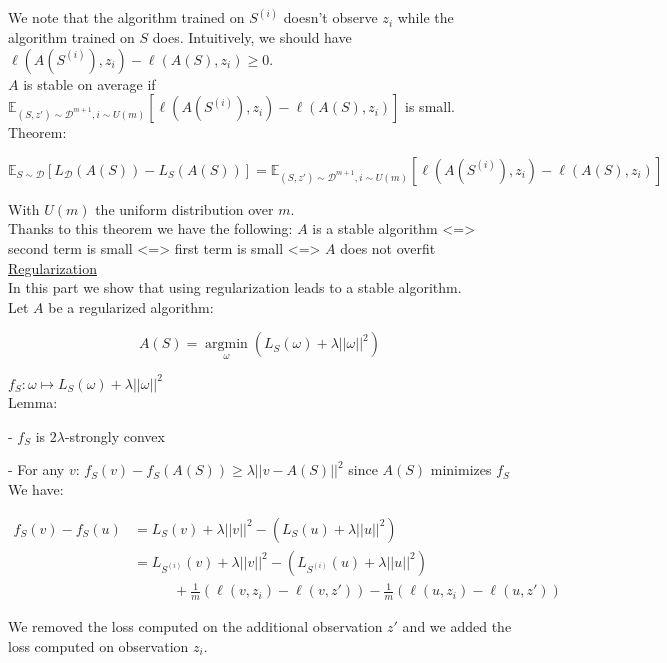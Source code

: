We note that the algorithm trained on $S^{(i)}$ doesn't observe $z_i$ while the algorithm trained on $S$ does. Intuitively, we should have $\ell(A(S^{(i)}),z_i) - \ell(A(S),z_i) \geq 0$. \\

$A$ is stable on average if $\mathbb{E}_{(S,z') \sim \mathcal{D}^{m+1}, i \sim U(m)}[\ell(A(S^{(i)}),z_i) - \ell(A(S),z_i)]$ is small. \\

Theorem: 

$$\mathbb{E}_{S \sim \mathcal{D}}[L_{\mathcal{D}}(A(S)) - L_S(A(S))] = \mathbb{E}_{(S,z') \sim \mathcal{D}^{m+1}, i \sim U(m)}[\ell(A(S^{(i)}),z_i) - \ell(A(S),z_i)]$$

With $U(m)$ the uniform distribution over $m$. \\

Thanks to this theorem we have the following: $A$ is a stable algorithm <=> second term is small <=> first term is small <=> $A$ does not overfit \\

\underline{Regularization} \\

In this part we show that using regularization leads to a stable algorithm. \\

Let $A$ be a regularized algorithm:

$$A(S) = \underset{\omega}{\operatorname{argmin}} (L_S(\omega) + \lambda || \omega ||^2)$$

$f_S : \omega \mapsto L_S(\omega) + \lambda || \omega ||^2$ \\

Lemma: 

- $f_S$ is $2\lambda$-strongly convex

- For any $v$: $f_S(v) - f_S(A(S)) \geq \lambda || v - A(S) ||^2$  since $A(S)$ minimizes $f_S$ \\

We have:

\begin{align*}
  f_S(v) - f_S(u) &= L_S(v) + \lambda || v ||^2 - (L_S(u) + \lambda || u ||^2) \\
            &= L_{S^{(i)}}(v) + \lambda || v ||^2 - (L_{S^{(i)}}(u) + \lambda || u ||^2) \\
	   &~~~~~~~~~~~~~+ \frac{1}{m}(\ell(v, z_i) - \ell(v, z')) - \frac{1}{m}(\ell(u, z_i) - \ell(u, z'))
\end{align*}

We removed the loss computed on the additional observation $z'$ and we added the loss computed on observation $z_i$.

